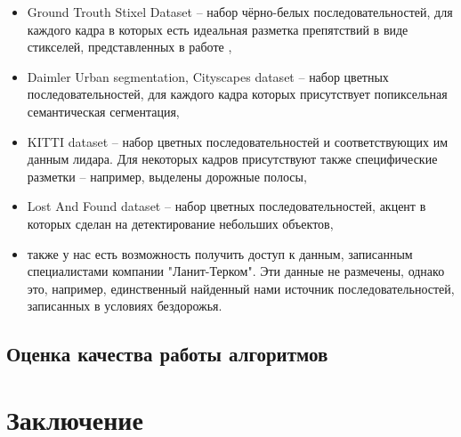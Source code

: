 \documentclass[aps,%
14pt,%
final,%
oneside,
onecolumn,%
musixtex, %
superscriptaddress,%
centertags]{extarticle} %
\begin{document}
\begin{itemize}
    \item Ground Trouth Stixel Dataset -- набор чёрно-белых последовательностей, для каждого кадра в которых есть идеальная разметка препятствий в виде стикселей, представленных в работе \cite{pfeiffer2010efficient},
    \item Daimler Urban segmentation, Cityscapes dataset -- набор цветных последовательностей, для каждого кадра которых присутствует попиксельная семантическая сегментация,
    \item KITTI dataset -- набор цветных последовательностей и соответствующих им данным лидара. Для некоторых кадров присутствуют также специфические разметки -- например, выделены дорожные полосы,
    \item Lost And Found dataset -- набор цветных последовательностей, акцент в которых сделан на детектирование небольших объектов,
    \item также у нас есть возможность получить доступ к данным, записанным специалистами компании "Ланит-Терком". Эти данные не размечены, однако это, например, единственный найденный нами источник последовательностей, записанных в условиях бездорожья.
\end{itemize}

\subsection{Оценка качества работы алгоритмов}

\section{Заключение}



\newpage
\end{document}
